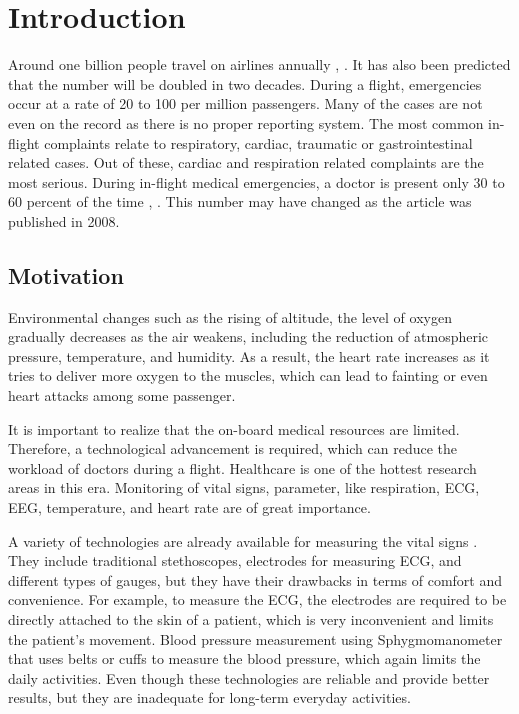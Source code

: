 \chapter{Introduction}

Around one billion people travel on airlines annually \cite{PMC2577402}, \cite{aerospace2003medical}. It has also been predicted that the number will be doubled in two decades. During a flight, emergencies occur at a rate of 20 to 100 per million passengers. Many of the cases are not even on the record as there is no proper reporting system. The most common in-flight complaints relate to respiratory, cardiac, traumatic or gastrointestinal related cases. Out of these, cardiac and respiration related complaints are the most serious. During in-flight medical emergencies, a doctor is present only 30 to 60 percent of the time \cite{PMC2577402}, \cite{PMC1119071}. This number may have changed as the article was published in 2008.


\section{Motivation}

Environmental changes such as the rising of altitude, the level of oxygen gradually decreases as the air weakens, including the reduction of atmospheric pressure, temperature, and humidity. As a result, the heart rate increases as it tries to deliver more oxygen to the muscles, which can lead to fainting or even heart attacks among some passenger.

It is important to realize that the on-board medical resources are limited. Therefore, a technological advancement is required, which can reduce the workload of doctors during a flight. Healthcare is one of the hottest research areas in this era. Monitoring of vital signs, parameter, like respiration, ECG, EEG, temperature, and heart rate are of great importance.

A variety of technologies are already available for measuring the vital signs \cite{naturectlesshcs}. They include traditional stethoscopes, electrodes for measuring ECG, and different types of gauges, but they have their drawbacks in terms of comfort and convenience. For example, to measure the ECG, the electrodes are required to be directly attached to the skin of a patient, which is very inconvenient and limits the patient's movement. Blood pressure measurement using Sphygmomanometer that uses belts or cuffs to measure the blood pressure, which again limits the daily activities. Even though these technologies are reliable and provide better results, but they are inadequate for long-term everyday activities.

